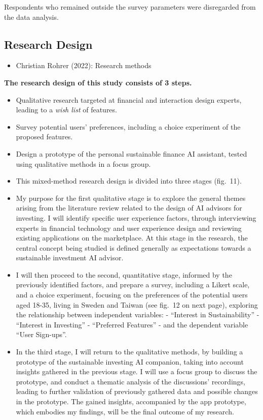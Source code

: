 \documentclass[
  letterpaper,
  DIV=11,
  numbers=noendperiod]{scrartcl}
\providecommand{\tightlist}{%
  \setlength{\itemsep}{0pt}\setlength{\parskip}{0pt}}\usepackage{longtable,booktabs,array}
\begin{document}
Respondents who remained outside the survey parameters were disregarded
from the data analysis.

\subsection{Research Design}\label{research-design}

\begin{itemize}
\tightlist
\item
  Christian Rohrer (2022): Research methods
\end{itemize}

\textbf{The research design of this study consists of 3 steps.}

\begin{itemize}
\tightlist
\item
  Qualitative research targeted at financial and interaction design
  experts, leading to a \emph{wish list} of features.
\item
  Survey potential users' preferences, including a choice experiment of
  the proposed features.
\item
  Design a prototype of the personal sustainable finance AI assistant,
  tested using qualitative methods in a focus group.
\item
  This mixed-method research design is divided into three stages
  (fig.~11).
\item
  My purpose for the first qualitative stage is to explore the general
  themes arising from the literature review related to the design of AI
  advisors for investing. I will identify specific user experience
  factors, through interviewing experts in financial technology and user
  experience design and reviewing existing applications on the
  marketplace. At this stage in the research, the central concept being
  studied is defined generally as expectations towards a sustainable
  investment AI advisor.
\item
  I will then proceed to the second, quantitative stage, informed by the
  previously identified factors, and prepare a survey, including a
  Likert scale, and a choice experiment, focusing on the preferences of
  the potential users aged 18-35, living in Sweden and Taiwan (see
  fig.~12 on next page), exploring the relationship between independent
  variables: - ``Interest in Sustainability'' - ``Interest in
  Investing'' - ``Preferred Features'' - and the dependent variable
  ``User Sign-ups''.
\item
  In the third stage, I will return to the qualitative methods, by
  building a prototype of the sustainable investing AI companion, taking
  into account insights gathered in the previous stage. I will use a
  focus group to discuss the prototype, and conduct a thematic analysis
  of the discussions' recordings, leading to further validation of
  previously gathered data and possible changes in the prototype. The
  gained insights, accompanied by the app prototype, which embodies my
  findings, will be the final outcome of my research.
\end{itemize}
\end{document}
